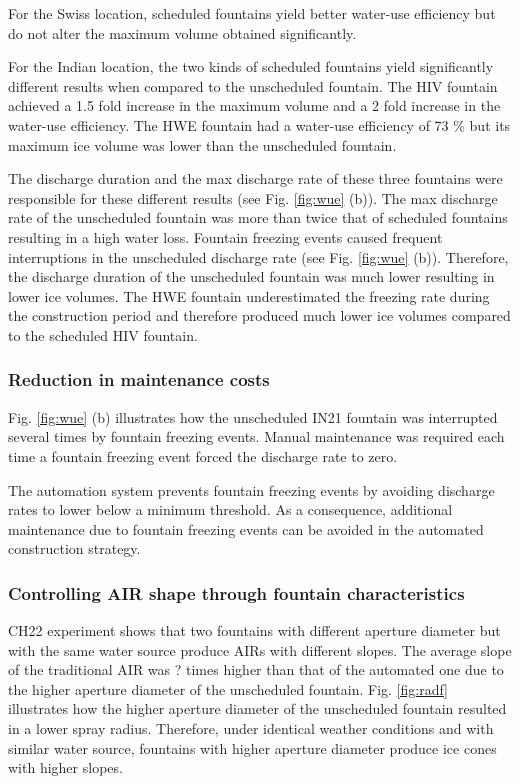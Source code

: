 \documentclass[tc, manuscript]{copernicus}
\begin{document}
For the Swiss location, scheduled fountains yield better water-use efficiency but do not alter the maximum
volume obtained significantly. 

For the Indian location, the two kinds of scheduled fountains yield significantly different results when
compared to the unscheduled fountain. The HIV fountain achieved a 1.5 fold increase in the maximum volume and a
2 fold increase in the water-use efficiency. The HWE fountain had a water-use efficiency of 73 \% but its
maximum ice volume was lower than the unscheduled fountain. 

The discharge duration and the max discharge rate of these three fountains were responsible for these different
results (see Fig. \ref{fig:wue} (b)). The max discharge rate of the unscheduled fountain was more than twice
that of scheduled fountains resulting in a high water loss.  Fountain freezing events caused frequent
interruptions in the unscheduled discharge rate (see Fig. \ref{fig:wue} (b)). Therefore, the discharge duration
of the unscheduled fountain was much lower resulting in lower ice volumes. The HWE fountain underestimated the
freezing rate during the construction period and therefore produced much lower ice volumes compared to the
scheduled HIV fountain.

\subsubsection{Reduction in maintenance costs}

Fig. \ref{fig:wue} (b) illustrates how the unscheduled IN21 fountain was interrupted several times by fountain
freezing events. Manual maintenance was required each time a fountain freezing event forced the discharge rate
to zero.

The automation system prevents fountain freezing events by avoiding discharge rates to lower below a minimum
threshold. As a consequence, additional maintenance due to fountain freezing events can be avoided in the
automated construction strategy.

\subsubsection{Controlling AIR shape through fountain characteristics}

CH22 experiment shows that two fountains with different aperture diameter but with the same water source produce
AIRs with different slopes. The average slope of the traditional AIR was ? times higher than that of the
automated one due to the higher aperture diameter of the unscheduled fountain.  Fig. \ref{fig:radf} illustrates
how the higher aperture diameter of the unscheduled fountain resulted in a lower spray radius.  Therefore, under
identical weather conditions and with similar water source, fountains with higher aperture diameter produce ice
cones with higher slopes.
\end{document}
